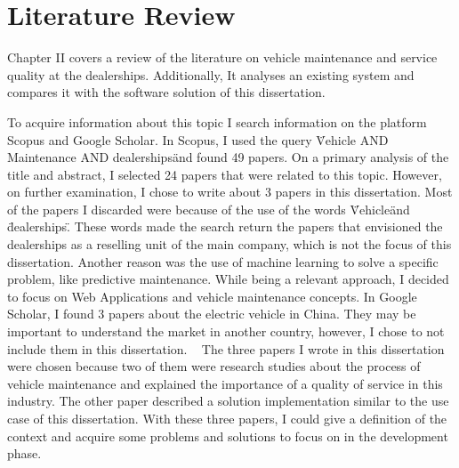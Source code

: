 \chapter{Literature Review}%
\label{chapter:literatureReview}

\begin{introduction}
  Chapter II covers a review of the literature on vehicle maintenance and service quality at the dealerships. 
  Additionally, It analyses an existing system and compares it with the software solution of this dissertation.
\end{introduction} 


To acquire information about this topic I search information on the platform Scopus and Google Scholar. 
In Scopus, I used the query \"Vehicle AND Maintenance AND dealerships\" and found 49 papers.
On a primary analysis of the title and abstract, I selected 24 papers that were related to this topic.
However, on further examination, I chose to write about 3 papers in this dissertation. 
Most of the papers I discarded were because of the use of the words \"Vehicle\" and \"dealerships\". 
These words made the search return the papers that envisioned the dealerships as a reselling unit of the main company, which is not the focus of this dissertation.
Another reason was the use of machine learning to solve a specific problem, like predictive maintenance. 
While being a relevant approach, I decided to focus on Web Applications and vehicle maintenance concepts.
In Google Scholar, I found 3 papers about the electric vehicle in China. 
They may be important to understand the market in another country, however, I chose to not include them in this dissertation.  
The three papers I wrote in this dissertation were chosen because two of them were research studies about the process of vehicle maintenance and explained the importance of a quality of service in this industry.
The other paper described a solution implementation similar to the use case of this dissertation.
With these three papers, I could give a definition of the context and acquire some problems and solutions to focus on in the development phase.  




